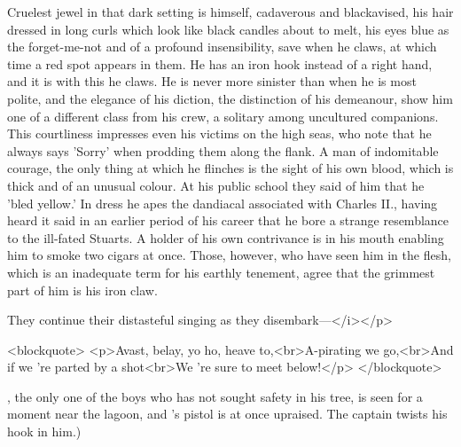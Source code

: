 \begin{stagedir}
Cruelest jewel in that dark setting is \hook himself, cadaverous and blackavised, his hair dressed in long curls which look like black candles about to melt, his eyes blue as the forget-me-not and of a profound insensibility, save when he claws, at which time a red spot appears in them.
He has an iron hook instead of a right hand, and it is with this he claws.
He is never more sinister than when he is most polite, and the elegance of his diction, the distinction of his demeanour, show him one of a different class from his crew, a solitary among uncultured companions.
This courtliness impresses even his victims on the high seas, who note that he always says 'Sorry' when prodding them along the flank.
A man of indomitable courage, the only thing at which he flinches is the sight of his own blood, which is thick and of an unusual colour.
At his public school they said of him that he 'bled yellow.'
In dress he apes the dandiacal associated with Charles II., having heard it said in an earlier period of his career that he bore a strange resemblance to the ill-fated Stuarts.
A holder of his own contrivance is in his mouth enabling him to smoke two cigars at once.
Those, however, who have seen him in the flesh, which is an inadequate term for his earthly tenement, agree that the grimmest part of him is his iron claw.

They continue their distasteful singing as they disembark—</i></p>


\begin{drama}

\speakercontinues
<blockquote> <p>Avast, belay, yo ho, heave to,<br>A-pirating we go,<br>And if we 're parted by a shot<br>We 're sure to meet below!</p> </blockquote>

\end{drama}


\nibs, the only one of the boys who has not sought safety in his tree, is seen for a moment near the lagoon,
and \starkey's pistol is at once upraised.
The captain twists his hook in him.)

\end{stagedir}

